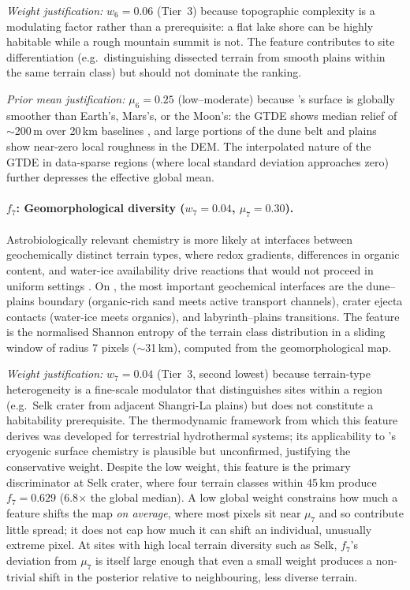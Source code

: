 \textit{Weight justification:} $w_6 = 0.06$ (Tier~3) because topographic complexity is a modulating factor rather than a prerequisite: a flat lake shore can be highly habitable while a rough mountain summit is not.  The feature contributes to site differentiation (e.g.\ distinguishing dissected terrain from smooth plains within the same terrain class) but should not dominate the ranking.

\textit{Prior mean justification:} $\mu_6 = 0.25$ (low--moderate) because \titan{}'s surface is globally smoother than Earth's, Mars's, or the Moon's: the GTDE shows median relief of $\sim$200\,m over 20\,km baselines \citep{Corlies2017Titan}, and large portions of the dune belt and plains show near-zero local roughness in the DEM.  The interpolated nature of the GTDE in data-sparse regions (where local standard deviation approaches zero) further depresses the effective global mean.

\paragraph{$f_7$: Geomorphological diversity ($w_7 = 0.04$, $\mu_7 = 0.30$).}
Astrobiologically relevant chemistry is more likely at interfaces between geochemically distinct terrain types, where redox gradients, differences in organic content, and water-ice availability drive reactions that would not proceed in uniform settings \citep{RussellHall1997,Shock2007}.  On \titan{}, the most important geochemical interfaces are the dune--plains boundary (organic-rich sand meets active transport channels), crater ejecta contacts (water-ice meets organics), and labyrinth--plains transitions.  The feature is the normalised Shannon entropy \citep{Shannon1948} of the terrain class distribution in a sliding window of radius 7 pixels ($\sim$31\,km), computed from the \citet{Lopes2019} geomorphological map.

\textit{Weight justification:} $w_7 = 0.04$ (Tier~3, second lowest) because terrain-type heterogeneity is a fine-scale modulator that distinguishes sites within a region (e.g.\ Selk crater from adjacent Shangri-La plains) but does not constitute a habitability prerequisite.  The \citet{Shock2007} thermodynamic framework from which this feature derives was developed for terrestrial hydrothermal systems; its applicability to \titan{}'s cryogenic surface chemistry is plausible but unconfirmed, justifying the conservative weight.  Despite the low weight, this feature is the primary discriminator at Selk crater, where four terrain classes within 45\,km produce $f_7 = 0.629$ (6.8$\times$ the global median).  A low global weight constrains how much a feature shifts the map \textit{on average}, where most pixels sit near $\mu_7$ and so contribute little spread; it does not cap how much it can shift an individual, unusually extreme pixel.  At sites with high local terrain diversity such as Selk, $f_7$'s deviation from $\mu_7$ is itself large enough that even a small weight produces a non-trivial shift in the posterior relative to neighbouring, less diverse terrain.

